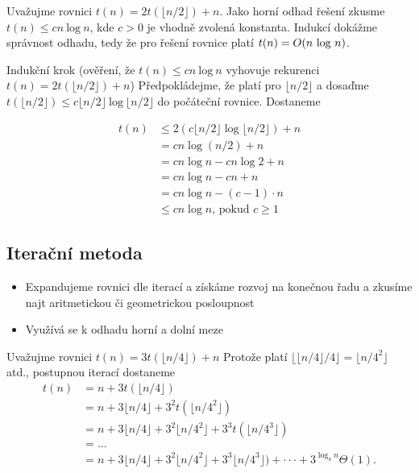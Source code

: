 \documentclass{szzclass}
\begin{document}
Uvažujme rovnici $t(n) = 2t(\lfloor n/2 \rfloor) + n$.
Jako horní odhad řešení zkusme
$t(n) \leq cn~\text{log}~n$, kde $c > 0$ je vhodně zvolená konstanta.
Indukcí dokážme správnost odhadu, tedy že pro řešení rovnice platí
$t(n) =\nolinebreak O(n~\text{log}~n)$.

Indukční krok
(ověření, že $t(n) \leq cn~\text{log}~n$ vyhovuje rekurenci $t(n) = 2t(\lfloor n/2 \rfloor) + n$)
Předpokládejme, že platí pro $\lfloor n/2 \rfloor$ a dosaďme
$t(\lfloor n/2 \rfloor) \leq c \lfloor n/2 \rfloor~\text{log}~ \lfloor n/2 \rfloor$ do počáteční rovnice. Dostaneme

\begin{align*}
t(n) &\leq 2(c \lfloor n/2 \rfloor \log{\lfloor n/2 \rfloor}) + n\\
     &= cn \log{(n/2)} + n\\
     &= cn \log{ n} - cn \log{} 2 + n\\
     &= cn \log{ n} - cn + n\\
     &= cn \log{ n} - (c - 1)\cdot n\\
     &\leq cn\log{n}\text{, pokud }c \geq 1
\end{align*}



\subsection{Iterační metoda}

\begin{itemize}
    \item Expandujeme rovnici dle iterací a získáme rozvoj na konečnou řadu a zkusíme najt aritmetickou či geometrickou posloupnost
    \item Využívá se k odhadu horní a dolní meze
\end{itemize}

Uvažujme rovnici
$t(n) = 3t(\lfloor n/4\rfloor) + n$
Protože platí $\lfloor \lfloor n/4\rfloor /4\rfloor = \lfloor n/4^2 \rfloor$
atd., postupnou iterací dostaneme
\begin{align*}
t(n) &= n + 3t(\lfloor n/4 \rfloor)\\
     &= n + 3 \lfloor n/4\rfloor + 3^2t(\lfloor n/4^2 \rfloor)\\
     &= n + 3 \lfloor n/4 \rfloor + 3^2\lfloor n/4^2 \rfloor + 3^3t(\lfloor n/4^3 \rfloor)\\
     &= . . .\\
     &= n + 3 \lfloor n/4\rfloor + 3^2 \lfloor n/4^2 \rfloor + 3^3 \lfloor n/4^3 \rfloor) + · · · + 3^{\log_4 n} \Theta(1).
\end{align*}
\end{document}
